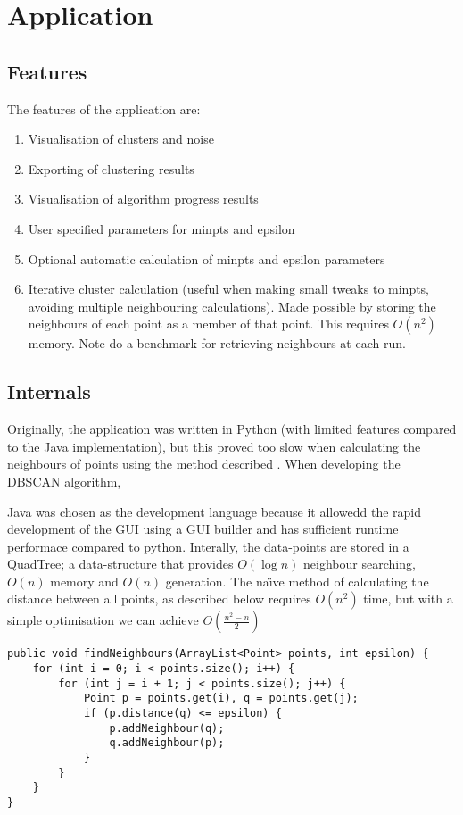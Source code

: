 \documentclass{CRPITStyle}
\begin{document}
\section{Application}
\subsection{Features}
The features of the application are:
\begin{enumerate}
\item Visualisation of clusters and noise
\item Exporting of clustering results
\item Visualisation of algorithm progress results
\item User specified parameters for minpts and epsilon
\item Optional automatic calculation of minpts and epsilon parameters 
\item Iterative cluster calculation (useful when making small tweaks to minpts, avoiding multiple neighbouring calculations). Made possible by storing the neighbours of each point as a member of that point. This requires $O(n^2)$ memory. Note do a benchmark for retrieving neighbours at each run.
\end{enumerate}

\subsection{Internals}
Originally, the application was written in Python (with limited features compared to the Java implementation), but this proved too slow when calculating the neighbours of points using the method described . When developing the DBSCAN algorithm, 

Java was chosen as the development language because it allowedd the rapid development of the GUI using a GUI builder and has sufficient runtime performace compared to python. Interally, the data-points are stored in a QuadTree; a data-structure that provides $O(\log n)$ neighbour searching, $O(n)$ memory and $O(n)$ generation. The na\"{\i}ve method of calculating the distance between all points, as described below requires $O(n^2)$ time, but with a simple optimisation we can achieve $O(\frac{n^2 -n}{2})$

\begin{lstlisting}[caption=A na\"{\i}ve implementation for calculating which points are neighbours]
public void findNeighbours(ArrayList<Point> points, int epsilon) {
    for (int i = 0; i < points.size(); i++) {
        for (int j = i + 1; j < points.size(); j++) {
            Point p = points.get(i), q = points.get(j);
            if (p.distance(q) <= epsilon) {
                p.addNeighbour(q);
                q.addNeighbour(p);
            }
        }
    }
}

\end{lstlisting}
\end{document}
